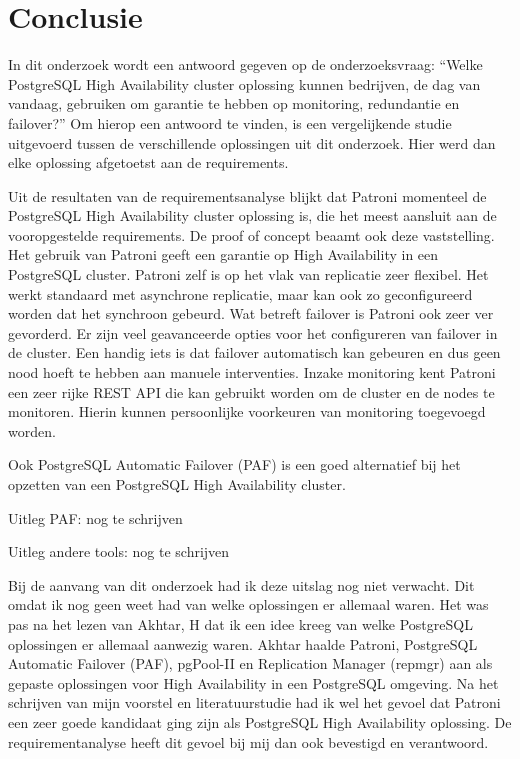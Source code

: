 
\chapter{Conclusie}
\label{ch:conclusie}

In dit onderzoek wordt een antwoord gegeven op de onderzoeksvraag: “Welke PostgreSQL High Availability cluster oplossing kunnen bedrijven, de dag van vandaag, gebruiken om garantie te hebben op monitoring, redundantie en failover?” Om hierop een antwoord te vinden, is een vergelijkende studie uitgevoerd tussen de verschillende oplossingen uit dit onderzoek. Hier werd dan elke oplossing afgetoetst aan de requirements.

Uit de resultaten van de requirementsanalyse blijkt dat Patroni momenteel de PostgreSQL High Availability cluster oplossing is, die het meest aansluit aan de vooropgestelde requirements. De proof of concept beaamt ook deze vaststelling. Het gebruik van Patroni geeft een garantie op High Availability in een PostgreSQL cluster. Patroni zelf is op het vlak van replicatie zeer flexibel. Het werkt standaard met asynchrone replicatie, maar kan ook zo geconfigureerd worden dat het synchroon gebeurd. Wat betreft failover is Patroni ook zeer ver gevorderd. Er zijn veel geavanceerde opties voor het configureren van failover in de cluster. Een handig iets is dat failover automatisch kan gebeuren en dus geen nood hoeft te hebben aan manuele interventies. Inzake monitoring kent Patroni een zeer rijke REST API die kan gebruikt worden om de cluster en de nodes te monitoren. Hierin kunnen persoonlijke voorkeuren van monitoring toegevoegd worden.

Ook PostgreSQL Automatic Failover (PAF) is een goed alternatief bij het opzetten van een PostgreSQL High Availability cluster.

Uitleg PAF: nog te schrijven

Uitleg andere tools: nog te schrijven

Bij de aanvang van dit onderzoek had ik deze uitslag nog niet verwacht. Dit omdat ik nog geen weet had van welke oplossingen er allemaal waren. Het was pas na het lezen van Akhtar, H dat ik een idee kreeg van welke PostgreSQL oplossingen er allemaal aanwezig waren. Akhtar haalde Patroni, PostgreSQL Automatic Failover (PAF), pgPool-II en Replication Manager (repmgr) aan als gepaste oplossingen voor High Availability in een PostgreSQL omgeving. Na het schrijven van mijn voorstel en literatuurstudie had ik wel het gevoel dat Patroni een zeer goede kandidaat ging zijn als PostgreSQL High Availability oplossing. De requirementanalyse heeft dit gevoel bij mij dan ook bevestigd en verantwoord.

